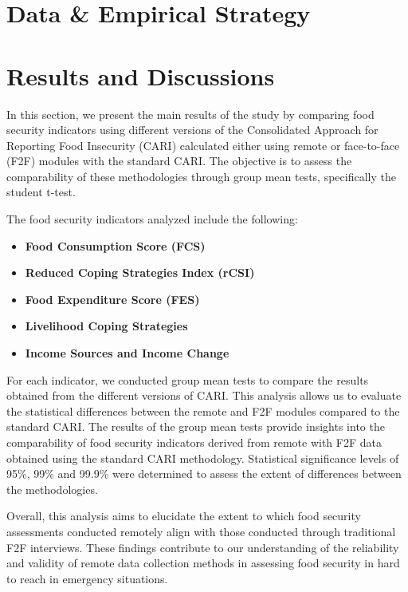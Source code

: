 \documentclass[11pt,harvard]{article}
\begin{document}
\pagebreak

\section{Data \& Empirical Strategy}

\pagebreak

\section{Results and Discussions}
	
In this section, we present the main results of the study by comparing food security indicators using different versions of the Consolidated Approach for Reporting Food Insecurity (CARI) calculated either using remote or face-to-face (F2F) modules with the standard CARI. The objective is to assess the comparability of these methodologies through group mean tests, specifically the student t-test.

The food security indicators analyzed include the following:
\begin{itemize}[label=--, left=2.75em]
	\item[1.]\textbf{Food Consumption Score (FCS)}
	\item[2.]\textbf{Reduced Coping Strategies Index (rCSI)}
	\item[3.]\textbf{Food Expenditure Score (FES)}
	\item[4.]\textbf{Livelihood Coping Strategies}
	\item[5.]\textbf{Income Sources and Income Change}
\end{itemize}
For each indicator, we conducted group mean tests to compare the results obtained from the different versions of CARI. This analysis allows us to evaluate the statistical differences between the remote and F2F modules compared to the standard CARI. The results of the group mean tests provide insights into the comparability of food security indicators derived from remote with F2F data obtained using the standard CARI methodology. Statistical significance levels of 95\%, 99\% and 99.9\% were determined to assess the extent of differences between the methodologies.

Overall, this analysis aims to elucidate the extent to which food security assessments conducted remotely align with those conducted through traditional F2F interviews. These findings contribute to our understanding of the reliability and validity of remote data collection methods in assessing food security in hard to reach in emergency situations.
\end{document}
